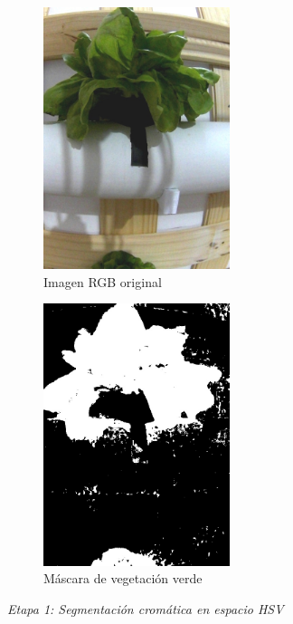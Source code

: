 \begin{figure}[H]
\centering
\begin{subfigure}[b]{0.45\textwidth}
    \centering
    \includegraphics[width=0.6\textwidth]{imagenes/clasificador_1_original.jpg}
    \caption{Imagen RGB original}
\end{subfigure}
\hfill
\begin{subfigure}[b]{0.45\textwidth}
    \centering
    \includegraphics[width=0.6\textwidth]{imagenes/clasificador_2_verde.jpg}
    \caption{Máscara de vegetación verde}
\end{subfigure}
\caption{\textit{Etapa 1: Segmentación cromática en espacio HSV}}
\label{fig:clasificador_etapa1}
\end{figure}

